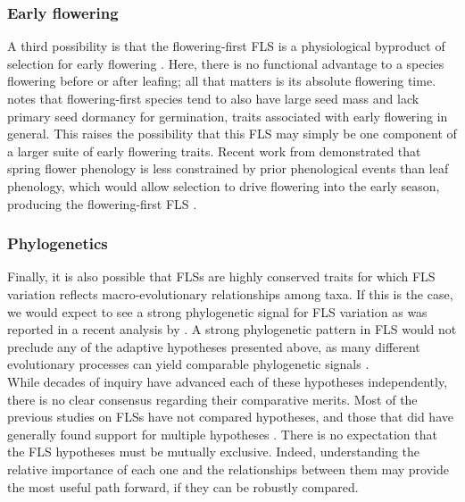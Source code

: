 \documentclass[11pt]{article}
\begin{document}
\subsubsection*{Early flowering}
\noindent A third possibility is that the flowering-first FLS is a physiological byproduct of selection for early flowering \citep{Primack1987}. Here, there is no functional advantage to a species flowering before or after leafing; all that matters is its absolute flowering time. \citet{Primack1987} notes that flowering-first species tend to also have large seed mass and lack primary seed dormancy for germination, traits associated with early flowering in general. This raises the possibility that this FLS may simply be one component of a larger suite of early flowering traits. Recent work from \citet{Savage2019} demonstrated that spring flower phenology is less constrained by prior phenological events than leaf phenology, which would allow selection to drive flowering into the early season, producing the flowering-first FLS . %

\subsubsection*{Phylogenetics} 
\noindent Finally, it is also possible that FLSs are highly conserved traits for which FLS variation reflects macro-evolutionary relationships among taxa. If this is the case, we would expect to see a strong phylogenetic signal for FLS variation as was reported in a recent analysis by \citet{Gougherty2018}. A strong phylogenetic pattern in FLS would not preclude any of the adaptive hypotheses presented above, as  many different evolutionary processes can yield comparable phylogenetic signals \citep{Revell2008}. \\

\noindent While decades of inquiry have advanced each of these hypotheses independently, there is no clear consensus regarding their comparative merits. Most of the previous studies on FLSs have not compared hypotheses, and those that did have generally found support for multiple hypotheses \citep[see][]{Bolmgren2003,Gougherty2018}. There is no expectation that the FLS hypotheses must be mutually exclusive. Indeed, understanding the relative importance of each one and the relationships between them may provide the most useful path forward, if they can be robustly compared.\\
\end{document}
